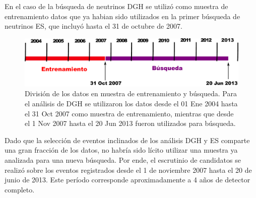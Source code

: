 	En el caso de la búsqueda de neutrinos DGH se utilizó como muestra de entrenamiento datos que ya habian sido utilizados en la primer búsqueda de neutrinos ES, que incluyó hasta el 31 de octubre de 2007.%
	\begin{figure}[ht]
	\begin{center}
	\includegraphics[width=\textwidth]{fig/seleccionAuger/periodosDGH}
	\caption{División de los datos en muestra de entrenamiento y búsqueda. Para el análisis de DGH se utilizaron los datos desde el 01 Ene 2004 hasta el 31 Oct 2007 como muestra de entrenamiento, mientras que desde el 1 Nov 2007 hasta el 20 Jun 2013 fueron utilizados para búsqueda.}
	\label{fig:periodosDGH}
	\end{center}
	\end{figure}
	Dado que la selección de eventos inclinados de los análisis DGH y ES comparte una gran fracción de los datos, no habría sido lícito utilizar una muestra ya analizada para una nueva búsqueda.
	Por ende, el escrutinio de candidatos se realizó sobre los eventos registrados desde el 1 de noviembre 2007 hasta el 20 de junio de 2013.
	Este período corresponde aproximadamente a 4 años de detector completo.
	
